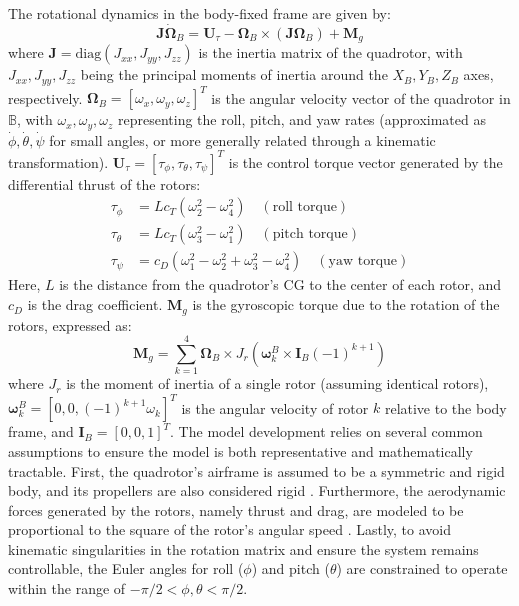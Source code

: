 The rotational dynamics in the body-fixed frame are given by:
\begin{equation}
\label{eq:rotational_dyn_quad}
\mathbf{J} \dot{\mathbf{\Omega}}_B = \mathbf{U}_{\tau} - \mathbf{\Omega}_B \times (\mathbf{J} \mathbf{\Omega}_B) + \mathbf{M}_{g}
\end{equation}
where $\mathbf{J} = \text{diag}(J_{xx}, J_{yy}, J_{zz})$ is the inertia matrix of the quadrotor, with $J_{xx}, J_{yy}, J_{zz}$ being the principal moments of inertia around the $X_B, Y_B, Z_B$ axes, respectively. $\mathbf{\Omega}_B = [\omega_x, \omega_y, \omega_z]^T$ is the angular velocity vector of the quadrotor in $\mathbb{B}$, with $\omega_x, \omega_y, \omega_z$ representing the roll, pitch, and yaw rates (approximated as $\dot{\phi}, \dot{\theta}, \dot{\psi}$ for small angles, or more generally related through a kinematic transformation). $\mathbf{U}_{\tau} = [\tau_{\phi}, \tau_{\theta}, \tau_{\psi}]^T$ is the control torque vector generated by the differential thrust of the rotors:
\begin{align}
\label{eq:control_torques_quad}
\tau_{\phi} &= L c_T (\omega_{2}^2 - \omega_{4}^2) \quad (\text{roll torque}) \\
\tau_{\theta} &= L c_T (\omega_{3}^2 - \omega_{1}^2) \quad (\text{pitch torque}) \\
\tau_{\psi} &= c_D (\omega_{1}^2 - \omega_{2}^2 + \omega_{3}^2 - \omega_{4}^2) \quad (\text{yaw torque})
\end{align}
Here, $L$ is the distance from the quadrotor's CG to the center of each rotor, and $c_D$ is the drag coefficient. $\mathbf{M}_{g}$ is the gyroscopic torque due to the rotation of the rotors, expressed as:
\begin{equation}
\label{eq:gyroscopic_torque_quad}
\mathbf{M}_{g} = \sum_{k=1}^{4} \mathbf{\Omega}_B \times J_r (\mathbf{\omega}_{k}^B \times \mathbf{I}_B (-1)^{k+1})
\end{equation}
where $J_r$ is the moment of inertia of a single rotor (assuming identical rotors), $\mathbf{\omega}_{k}^B = [0, 0, (-1)^{k+1}\omega_{k}]^T$ is the angular velocity of rotor $k$ relative to the body frame, and $\mathbf{I}_B = [0,0,1]^T$.
The model development relies on several common assumptions to ensure the model is both representative and mathematically tractable. First, the quadrotor's airframe is assumed to be a symmetric and rigid body, and its propellers are also considered rigid \cite{RigidBody}. Furthermore, the aerodynamic forces generated by the rotors, namely thrust and drag, are modeled to be proportional to the square of the rotor's angular speed \cite{ThrustDrag}. Lastly, to avoid kinematic singularities in the rotation matrix and ensure the system remains controllable, the Euler angles for roll ($\phi$) and pitch ($\theta$) are constrained to operate within the range of $-\pi/2 < \phi, \theta < \pi/2$.

